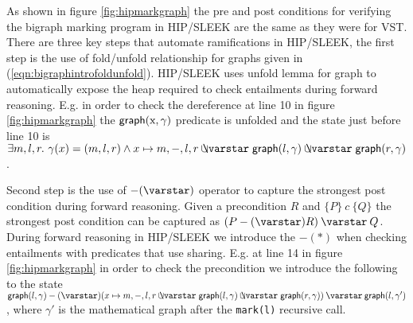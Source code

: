 As shown in figure \ref{fig:hipmarkgraph} the pre and post conditions for verifying the bigraph marking program in HIP/SLEEK are the same as they were for VST. There are three key steps that automate ramifications in HIP/SLEEK, the first step is the use of fold/unfold relationship for graphs given in (\ref{eqn:bigraphintrofoldunfold}). HIP/SLEEK uses unfold lemma for graph to automatically expose the heap required to check entailments during forward reasoning. E.g. in order to check the dereference at line 10 in figure \ref{fig:hipmarkgraph} the $\mathsf{graph}(\text{x},\gamma)$ predicate is unfolded and the state just before line 10 is $ \exists m,l,r.~ \gamma(x)=(m,l,r) \wedge x \mapsto m,-,l,r \ocon \p{graph}(l, \gamma) \ocon \p{graph}(r, \gamma)$.

Second step is the use of $-(\scon)$ operator to capture the strongest post condition during forward reasoning. Given a precondition $R$ and $\{P\}~c~\{Q\}$ the strongest post condition can be captured as $(P -(\scon) R) \scon Q$. During forward reasoning in HIP/SLEEK we introduce the $-(*)$ when checking entailments with predicates that use sharing. E.g. at line 14 in figure \ref{fig:hipmarkgraph} in order to check the precondition we introduce the following to the state $  \p{graph}(l, \gamma) -(\scon) (x \mapsto m,-,l,r \ocon \p{graph}(l, \gamma) \ocon \p{graph}(r, \gamma)) \scon \p{graph}(l, \gamma')$, where $\gamma'$ is the mathematical graph after the \texttt{mark(l)} recursive call.


